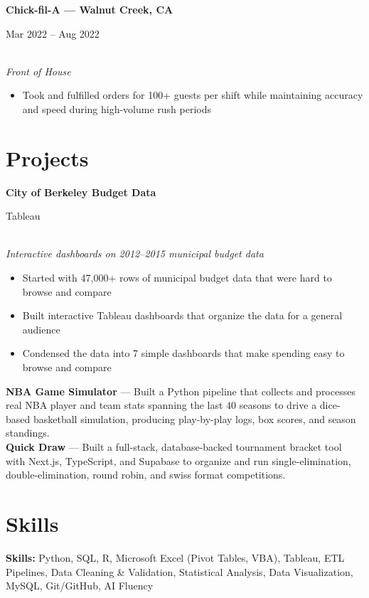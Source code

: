 \documentclass[11pt,letterpaper]{article}
\newcommand{\entry}[3]{%
  \noindent\begin{minipage}[t]{0.72\textwidth}\raggedright\textbf{#1}\end{minipage}%
  \hfill\begin{minipage}[t]{0.26\textwidth}\raggedleft\small\color{gray}#2\end{minipage}\\
  \textit{#3}\par\vspace{2pt}
}
\newcommand{\entryhl}[3]{%
  \noindent\begin{minipage}[t]{0.72\textwidth}\raggedright\textbf{\color{accent}#1}\end{minipage}%
  \hfill\begin{minipage}[t]{0.26\textwidth}\raggedleft\small\color{gray}#2\end{minipage}\\
  \textit{#3}\par\vspace{2pt}
}
\begin{document}
\entry{Chick-fil-A --- Walnut Creek, CA}{Mar 2022 -- Aug 2022}{Front of House}
\begin{itemize}
  \item Took and fulfilled orders for 100+ guests per shift while maintaining accuracy and speed during high-volume rush periods
\end{itemize}

\section*{Projects}

\entryhl{City of Berkeley Budget Data}{Tableau}{Interactive dashboards on 2012--2015 municipal budget data}
\begin{itemize}
  \item Started with 47,000+ rows of municipal budget data that were hard to browse and compare
  \item Built interactive Tableau dashboards that organize the data for a general audience
  \item Condensed the data into 7 simple dashboards that make spending easy to browse and compare
\end{itemize}

\noindent\textbf{NBA Game Simulator} --- Built a Python pipeline that collects and processes real NBA player and team stats spanning the last 40 seasons to drive a dice-based basketball simulation, producing play-by-play logs, box scores, and season standings.\\[4pt]
\textbf{Quick Draw} --- Built a full-stack, database-backed tournament bracket tool with Next.js, TypeScript, and Supabase to organize and run single-elimination, double-elimination, round robin, and swiss format competitions.

\section*{Skills}
\textbf{Skills:} Python, SQL, R, Microsoft Excel (Pivot Tables, VBA), Tableau, ETL Pipelines, Data Cleaning \& Validation, Statistical Analysis, Data Visualization, MySQL, Git/GitHub, AI Fluency
\end{document}
